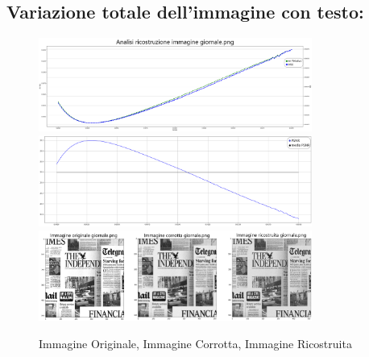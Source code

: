 {\color{rred}\subsection{Variazione totale dell'immagine con testo:}}
\begin{figure}[H]{}
    \centering
    \includegraphics[width=0.8\textwidth]{IMMAGINI_RELAZIONE/graficoGiornaleTOTVAR_ERRREL&MSE.png}
    \includegraphics[width=0.8\textwidth]{IMMAGINI_RELAZIONE/graficoGiornaleTOTVAR_PSNR&suaMedia.png}
    \includegraphics[width=0.8\textwidth]{imgRicostruzione/ricostruzioneGiornale_TOTVAR_maxPSNR23.20.png}
    \caption{Immagine Originale, Immagine Corrotta, Immagine Ricostruita}
\end{figure}


